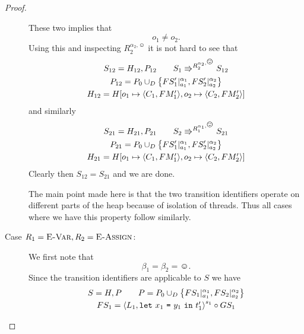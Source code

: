 \begin{proof}
\begin{description}
      These two implies that
      \begin{equation}
        o_1 \neq o_2.
      \end{equation}
      Using this and inspecting $R_2^{\alpha_2, \smiley}$ it is not hard to see
      that 
      \begin{equation}
        \begin{gathered}
          S_{12} = H_{12}, P_{12} \andalso S_1 \Rrightarrow^{R_2^{\alpha_2,
          \smiley}} S_{12}
          \\
          P_{12} = P_0 \cup_D \left\{ FS'_1|_{a_1}^{\alpha_1},
          FS'_2|_{a_2}^{\alpha_2} \right\} \\
          H_{12} = H[o_1 \mapsto \Obj{C_1, FM'_1}, o_2 \mapsto \Obj{C_2, FM'_2}]
        \end{gathered}
      \end{equation}
      and similarly 
      \begin{equation}
        \begin{gathered}
          S_{21} = H_{21}, P_{21} \andalso S_2 \Rrightarrow^{R_1^{\alpha_1,
          \smiley}} S_{21}
          \\
          P_{21} = P_0 \cup_D \left\{ FS'_1|_{a_1}^{\alpha_1},
          FS'_2|_{a_2}^{\alpha_2} \right\} \\
          H_{21} = H[o_1 \mapsto \Obj{C_1, FM'_1}, o_2 \mapsto \Obj{C_2, FM'_2}]
        \end{gathered}
      \end{equation}
      Clearly then $S_{12} = S_{21}$ and we are done.
      \begin{remark}
        The main point made here is that the two transition identifiers operate
        on different parts of the heap because of isolation of threads. Thus all
        cases where we have this property follow similarly.
      \end{remark}
    \item[Case $R_1 = \mbox{{\sc E-Var}}, R_2 = \mbox{{\sc E-Assign}}$:] We first note that
      \begin{equation*}
        \beta_1 = \beta_2 = \smiley.
      \end{equation*}
      Since the transition identifiers are applicable to $S$ we have
      \begin{equation}
        \begin{gathered}
          S = H, P \andalso P = P_0 \cup_D \left\{ FS_1|_{a_1}^{\alpha_1},
          FS_2|_{a_2}^{\alpha_2} \right\} \\
          FS_1 = \xframe{L_1, \Let{x_1}{y_1}{t'_1}}^{s_1} \circ GS_1

\end{gathered}
\end{equation}
\end{description}
\end{proof}
